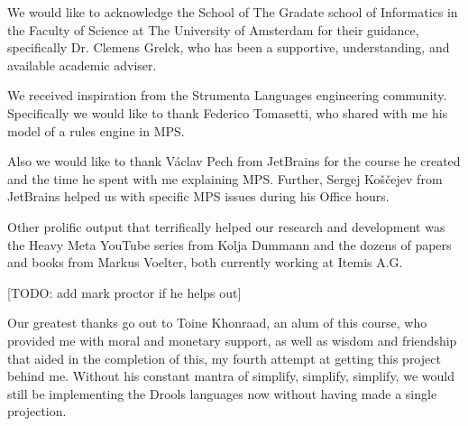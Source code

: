 \begin{acknowledgements}
    \addchaptertocentry{\acknowledgementname}
    We would like to acknowledge the School of The Gradate school of Informatics in the Faculty of Science at The University of Amsterdam for their guidance, specifically Dr. Clemens Grelck, who has been a supportive, understanding, and available academic adviser.
    

    We received inspiration from the Strumenta Languages engineering community.
    Specifically we would like to thank Federico Tomasetti, who shared with me his model of a rules engine in MPS.


    Also we would like to thank Václav Pech from JetBrains for the course he created and the time he spent with me explaining MPS. 
    Further, Sergej Koščejev from JetBrains helped us with specific MPS issues during his Office hours.


    Other prolific output that terrifically helped our research and development was the Heavy Meta YouTube series from Kolja Dummann and the dozens of papers and books from Markus Voelter, both currently working at Itemis A.G. 
    
    [TODO: add mark proctor if he helps out]

    Our greatest thanks go out to Toine Khonraad, an alum of this course, who provided me with moral and monetary support, as well as wisdom and friendship that aided in the completion of this, my fourth attempt at getting this project behind me. 
    Without his constant mantra of simplify, simplify, simplify, we would still be implementing the Drools languages now without having made a single projection.
    
\end{acknowledgements}